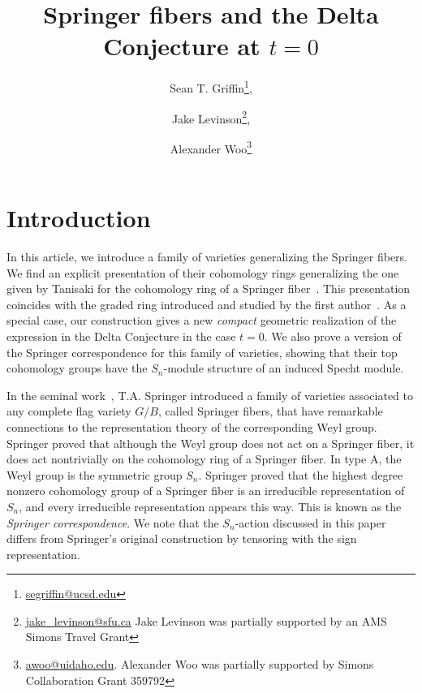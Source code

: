 \documentclass[submission]{FPSAC2021}
\title{Springer fibers and the Delta Conjecture at $t=0$}
\author{Sean T. Griffin\thanks{\href{mailto:segriffin@ucsd.edu}{segriffin@ucsd.edu}}\addressmark{1}, \and Jake Levinson\thanks{\href{mailto:jake_levinson@sfu.ca}{jake\_levinson@sfu.ca} Jake Levinson was partially supported by an AMS Simons Travel Grant}, \and Alexander Woo\thanks{\href{mailto:awoo@uidaho.edu}{awoo@uidaho.edu}.  Alexander Woo was partially supported by Simons Collaboration Grant 359792}}
\theoremstyle{plain}
\numberwithin{equation}{section}
\begin{document}
\maketitle

\section{Introduction}

In this article, we introduce a family of varieties generalizing the Springer fibers. We find an explicit presentation of their cohomology rings generalizing the one given by Tanisaki for the cohomology ring of a Springer fiber~\cite{Tanisaki}. This presentation coincides with the graded ring introduced and studied by the first author~\cite{GriffinOSP}.  As a special case, our construction gives a new \emph{compact} geometric realization of the  expression in the Delta Conjecture in the case $t=0$. We also prove a version of the Springer correspondence for this family of varieties, showing that their top cohomology groups have the $S_n$-module structure of an induced Specht module.



In the seminal work~\cite{Springer-WeylGrpReps,Springer-TrigSum}, T.A. Springer introduced a family of varieties associated to any complete flag variety $G/B$, called Springer fibers, that have remarkable connections to the representation theory of the corresponding Weyl group. Springer proved that although the Weyl group does not act on a Springer fiber, it does act nontrivially on the cohomology ring of a Springer fiber. In type A, the Weyl group is the symmetric group $S_n$. Springer proved that the highest degree nonzero cohomology group of a Springer fiber is an irreducible representation of $S_n$, and every irreducible representation appears this way. This is known as the \emph{Springer correspondence}. We note that the $S_n$-action discussed in this paper differs from Springer's original construction by tensoring with the sign representation.
\end{document}
